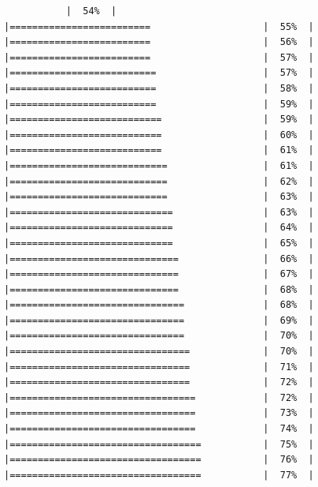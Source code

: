 \documentclass[
  krantz2]{krantz}
\begin{document}
\begin{verbatim}
           |  54%  |                                                     |=========================                    |  55%  |                                                     |=========================                    |  56%  |                                                     |=========================                    |  57%  |                                                     |==========================                   |  57%  |                                                     |==========================                   |  58%  |                                                     |==========================                   |  59%  |                                                     |===========================                  |  59%  |                                                     |===========================                  |  60%  |                                                     |===========================                  |  61%  |                                                     |============================                 |  61%  |                                                     |============================                 |  62%  |                                                     |============================                 |  63%  |                                                     |=============================                |  63%  |                                                     |=============================                |  64%  |                                                     |=============================                |  65%  |                                                     |==============================               |  66%  |                                                     |==============================               |  67%  |                                                     |==============================               |  68%  |                                                     |===============================              |  68%  |                                                     |===============================              |  69%  |                                                     |===============================              |  70%  |                                                     |================================             |  70%  |                                                     |================================             |  71%  |                                                     |================================             |  72%  |                                                     |=================================            |  72%  |                                                     |=================================            |  73%  |                                                     |=================================            |  74%  |                                                     |==================================           |  75%  |                                                     |==================================           |  76%  |                                                     |==================================           |  77%  |                                                     
\end{verbatim}
\end{document}
